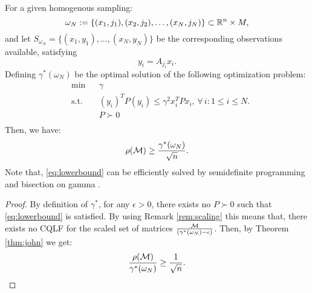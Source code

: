 \begin{theorem}
For a given homogenous sampling: $$\omega_N := \{(x_1, j_1), (x_2, j_2), \ldots, (x_N, j_N)\} \subset \mathbb{R}^n \times M,$$ and let $S_{\omega_N}=\{(x_1,y_1),...,(x_N,y_N)\}$ be the corresponding observations available, satisfying $$y_i= A_{j_i}x_i .$$
Defining $\gamma^*(\omega_N)$ be the optimal solution of the following optimization problem:
\begin{equation}\label{eq:lowerbound}
\begin{aligned}
& \text{min} & & \gamma \\
& \text{s.t.} 
&  & (y_i)^T P (y_i) \leq \gamma^2 x_i^TPx_i,\,  \forall \,i :1\leq i \leq N.\\
& && P \succ 0 \\
\end{aligned}
\end{equation}
Then, we have:
$$\rho(\mathcal{M}) \geq \frac{\gamma^*(\omega_N)}{\sqrt{n}}.$$ Note that, \eqref{eq:lowerbound} can be efficiently solved by semidefinite programming and bisection on gamma \cite{boyd}.

\end{theorem}
\begin{proof}
By definition of $\gamma^*$, for any $\epsilon > 0$, there exists no $P \succ 0$ such that \eqref{eq:lowerbound} is satisfied. By using Remark \ref{rem:scaling} this means that, there exists no CQLF for the scaled set of matrices $\frac{\mathcal{M}}{(\gamma^*(\omega_N)-\epsilon)}$. Then, by Theorem \ref{thm:john} we get:
\begin{equation*}\frac{\rho(\mathcal{M})}{\gamma^*(\omega_N)} \geq \frac{1}{\sqrt{n}}.\end{equation*}
\end{proof}